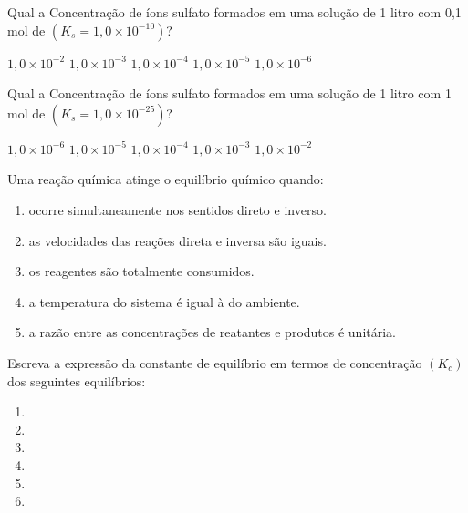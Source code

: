 \documentclass[a4paper,12]{exam}
\begin{document}
\begin{multicols}{2}
	\begin{questions}
		
	
			\question Qual a Concentração de íons sulfato formados em uma solução 			de 1 litro com 0,1 mol de  $(K_s = 1,0 \times 10^{-10})$?
			\begin{oneparchoices}
					\choice $1,0 \times 10^{-2}$
					\choice $1,0 \times 10^{-3}$
					\choice $1,0 \times 10^{-4}$
					\choice $1,0 \times 10^{-5}$
					\choice $1,0 \times 10^{-6}$
			\end{oneparchoices}

			\question Qual a Concentração de íons sulfato formados em uma solução 			de 1 litro com 1 mol de  $(K_s = 1,0 \times 10^{-25})$?\\
				\begin{oneparchoices}
						\choice $1,0 \times 10^{-6}$
						\choice $1,0 \times 10^{-5}$
						\choice $1,0 \times 10^{-4}$
						\choice $1,0 \times 10^{-3}$
						\choice $1,0 \times 10^{-2}$
				\end{oneparchoices}

			\question Uma reação química atinge o equilíbrio químico quando:
				\begin{enumerate}[label=\alph*)]
				  \item ocorre simultaneamente nos sentidos direto e inverso.
				  \item as velocidades das reações direta e inversa são iguais.
				  \item os reagentes são totalmente consumidos.
				  \item a temperatura do sistema é igual à do ambiente.
				  \item a razão entre as concentrações de reatantes e produtos é unitária.
				\end{enumerate}

				\question Escreva a expressão da constante de equilíbrio em termos de concentração $(K_c)$ dos seguintes equilíbrios:
				\begin{enumerate}[label=\alph*)]
				  \item {}
				  \item {}
				  \item {}
				  \item {}
				  \item {}
				  \item {}
				\end{enumerate}
		
		
		
	\end{questions}	
\end{multicols}
\end{document}
